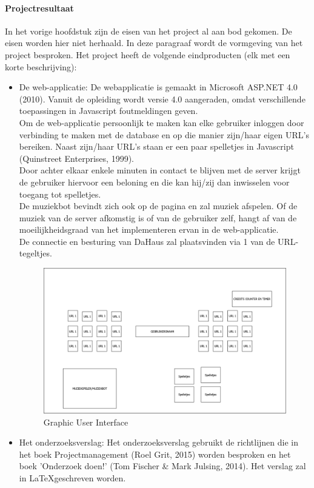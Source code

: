 \documentclass[11pt]{article}
\begin{document}
	\paragraph{Projectresultaat}
	\begin{flushleft}
		In het vorige hoofdstuk zijn de eisen van het project al aan bod gekomen. De eisen worden hier niet herhaald. In deze paragraaf wordt de vormgeving van het project besproken. 
		Het project heeft de volgende eindproducten (elk met een korte beschrijving):
		\begin{itemize}
			\item De web-applicatie: De webapplicatie is gemaakt in Microsoft ASP.NET 4.0 (2010). Vanuit de opleiding wordt versie 4.0 aangeraden, omdat verschillende toepassingen in Javascript foutmeldingen geven. \\ 
			Om de web-applicatie persoonlijk te maken kan elke gebruiker inloggen door verbinding te maken met de database en op die manier zijn/haar eigen URL's bereiken. Naast zijn/haar URL's staan er een paar spelletjes in Javascript (Quinstreet Enterprises, 1999).\\ Door achter elkaar enkele minuten in contact te blijven met de server krijgt de gebruiker hiervoor een beloning en die kan hij/zij dan inwisselen voor toegang tot spelletjes. \\De muziekbot bevindt zich ook op de pagina en zal muziek afspelen. Of de muziek van de server afkomstig is of van de gebruiker zelf, hangt af van de moeilijkheidsgraad van het implementeren ervan in de web-applicatie. \\
			De connectie en besturing van DaHaus zal plaatsvinden via 1 van de URL-tegeltjes. \\ \vspace{2mm}
			\begin{figure}
				\centering
				\includegraphics[width=\textwidth]{GUI} 
				\caption{Graphic User Interface}
			\end{figure}  \vspace{2mm}
			
			\item Het onderzoeksverslag: Het onderzoeksverslag gebruikt de richtlijnen die in het boek Projectmanagement (Roel Grit, 2015) worden besproken en het boek 'Onderzoek doen!' (Tom Fischer \& Mark Julsing, 2014). 
			Het verslag zal in \LaTeX geschreven worden. 
		\end{itemize}
		
		
		
	\end{flushleft}
\end{document}

